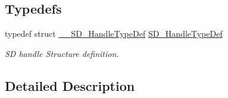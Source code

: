 \subsection*{Typedefs}
\begin{DoxyCompactItemize}
\item 
\mbox{\label{group___s_d___exported___types___group3_ga1f31eb64a86b0c740bb5c02fa4c9914d}} 
typedef struct \mbox{\hyperlink{struct_____s_d___handle_type_def}{\+\_\+\+\_\+\+S\+D\+\_\+\+Handle\+Type\+Def}} \mbox{\hyperlink{group___s_d___exported___types___group3_ga1f31eb64a86b0c740bb5c02fa4c9914d}{S\+D\+\_\+\+Handle\+Type\+Def}}
\begin{DoxyCompactList}\small\item\em SD handle Structure definition. \end{DoxyCompactList}\end{DoxyCompactItemize}


\subsection{Detailed Description}
